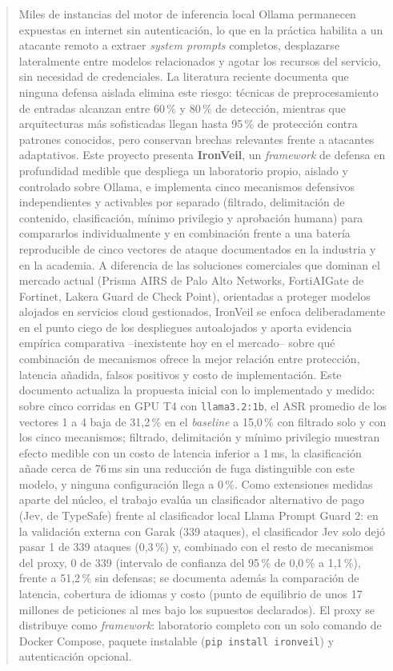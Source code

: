 \documentclass[11pt,letterpaper]{article}
\begin{document}
\begin{abstract}
\noindent
Miles de instancias del motor de inferencia local Ollama permanecen expuestas en internet sin autenticación, lo que en la práctica habilita a un atacante remoto a extraer \emph{system prompts} completos, desplazarse lateralmente entre modelos relacionados y agotar los recursos del servicio, sin necesidad de credenciales. La literatura reciente documenta que ninguna defensa aislada elimina este riesgo: técnicas de preprocesamiento de entradas alcanzan entre 60\,\% y 80\,\% de detección, mientras que arquitecturas más sofisticadas llegan hasta 95\,\% de protección contra patrones conocidos, pero conservan brechas relevantes frente a atacantes adaptativos. Este proyecto presenta \textbf{IronVeil}, un \emph{framework} de defensa en profundidad medible que despliega un laboratorio propio, aislado y controlado sobre Ollama, e implementa cinco mecanismos defensivos independientes y activables por separado (filtrado, delimitación de contenido, clasificación, mínimo privilegio y aprobación humana) para compararlos individualmente y en combinación frente a una batería reproducible de cinco vectores de ataque documentados en la industria y en la academia. A diferencia de las soluciones comerciales que dominan el mercado actual (Prisma AIRS de Palo Alto Networks, FortiAIGate de Fortinet, Lakera Guard de Check Point), orientadas a proteger modelos alojados en servicios cloud gestionados, IronVeil se enfoca deliberadamente en el punto ciego de los despliegues autoalojados y aporta evidencia empírica comparativa --inexistente hoy en el mercado-- sobre qué combinación de mecanismos ofrece la mejor relación entre protección, latencia añadida, falsos positivos y costo de implementación. Este documento actualiza la propuesta inicial con lo implementado y medido: sobre cinco corridas en GPU T4 con \texttt{llama3.2:1b}, el ASR promedio de los vectores 1 a 4 baja de 31,2\,\% en el \emph{baseline} a 15,0\,\% con filtrado solo y con los cinco mecanismos; filtrado, delimitación y mínimo privilegio muestran efecto medible con un costo de latencia inferior a 1\,ms, la clasificación añade cerca de 76\,ms sin una reducción de fuga distinguible con este modelo, y ninguna configuración llega a 0\,\%. Como extensiones medidas aparte del núcleo, el trabajo evalúa un clasificador alternativo de pago (Jev, de TypeSafe) frente al clasificador local Llama Prompt Guard 2: en la validación externa con Garak (339 ataques), el clasificador Jev solo dejó pasar 1 de 339 ataques (0,3\,\%) y, combinado con el resto de mecanismos del proxy, 0 de 339 (intervalo de confianza del 95\,\% de 0,0\,\% a 1,1\,\%), frente a 51,2\,\% sin defensas; se documenta además la comparación de latencia, cobertura de idiomas y costo (punto de equilibrio de unos 17 millones de peticiones al mes bajo los supuestos declarados). El proxy se distribuye como \emph{framework}: laboratorio completo con un solo comando de Docker Compose, paquete instalable (\texttt{pip install ironveil}) y autenticación opcional.


\end{abstract}
\end{document}

